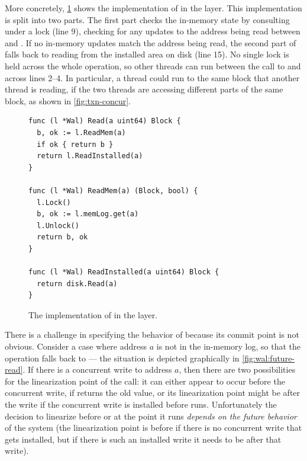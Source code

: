 More concretely, \cref{fig:walread} shows the implementation of  in the
 layer.  This implementation is split into two parts. The first part checks
the in-memory state by consulting  under a lock (line 9), checking for any
updates to the address being read between  and . If
no in-memory updates match the address being read, the second part of  falls back
to reading from the installed area on disk (line 15).  No single lock is held across the whole
operation, so other threads
can run between the call to  and  across lines
2--4.
In particular, a thread could run 
to the same block that another thread is reading, if the two threads
are accessing different parts of the same block, as shown in \cref{fig:txn-concur}.

\begin{figure}[ht]
\begin{verbatim}
func (l *Wal) Read(a uint64) Block {
  b, ok := l.ReadMem(a)
  if ok { return b }
  return l.ReadInstalled(a)
}

func (l *Wal) ReadMem(a) (Block, bool) {
  l.Lock()
  b, ok := l.memLog.get(a)
  l.Unlock()
  return b, ok
}

func (l *Wal) ReadInstalled(a uint64) Block {
  return disk.Read(a)
}
\end{verbatim}
\caption{The implementation of  in the  layer.}
\label{fig:walread}
\end{figure}

There is a challenge in specifying the behavior of  because its commit
point is not obvious. Consider a case
where address $a$ is not in the in-memory log, so that the  operation
falls back to  --- the situation is depicted graphically in
\cref{fig:wal:future-read}. If there is a concurrent write to address
$a$, then there are two possibilities for the linearization point of the
 call: it can either appear to occur before the concurrent write, if
 returns the old value, or its linearization point might be
after the write if the concurrent write is installed before
 runs. Unfortunately the decision to linearize before
 or at the point it runs \emph{depends on the future
  behavior} of the system (the linearization point is before if there is no
concurrent write that gets installed, but if there is such an installed write it
needs to be after that write).

